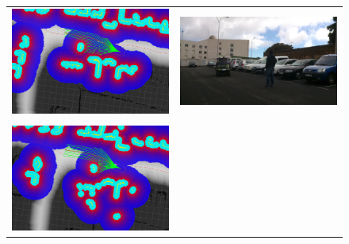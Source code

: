 \begin{figure}[h!]
    \centering
    \begin{tabular}{cc}
    \begin{minipage}{.45\textwidth}
        \centering
        \includegraphics[width=\textwidth]{example9}
    \end{minipage} &
    \begin{minipage}{.45\textwidth}
      \centering
        \includegraphics[width=\textwidth]{seq9}\label{fig:cp07_seq1}
    \end{minipage}\\ \\
    \begin{minipage}{.45\textwidth}
        \centering
        \includegraphics[width=\textwidth]{example10}

\end{minipage}
\end{tabular}
\end{figure}
